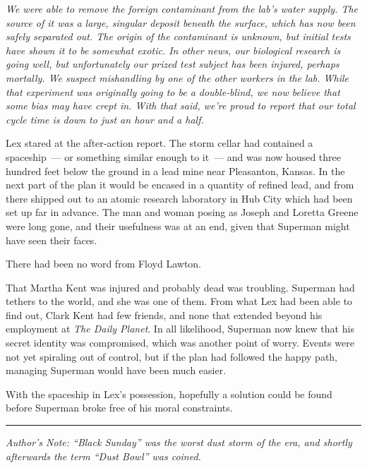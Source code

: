 \documentclass[ebook,12pt]{memoir}
\begin{document}
\emph{We were able to remove the foreign contaminant from the lab's
water supply. The source of it was a large, singular deposit beneath the
surface, which has now been safely separated out. The origin of the
contaminant is unknown, but initial tests have shown it to be somewhat
exotic. In other news, our biological research is going well, but
unfortunately our prized test subject has been injured, perhaps
mortally. We suspect mishandling by one of the other workers in the lab.
While that experiment was originally going to be a double‐blind, we now
believe that some bias may have crept in. With that said, we're proud to
report that our total cycle time is down to just an hour and a half.}

Lex stared at the after‐action report. The storm cellar had contained a
spaceship~--- or something similar enough to it~--- and was now housed
three hundred feet below the ground in a lead mine near Pleasanton,
Kansas. In the next part of the plan it would be encased in a quantity
of refined lead, and from there shipped out to an atomic research
laboratory in Hub City which had been set up far in advance. The man and
woman posing as Joseph and Loretta Greene were long gone, and their
usefulness was at an end, given that Superman might have seen their
faces.

There had been no word from Floyd Lawton.

That Martha Kent was injured and probably dead was troubling. Superman
had tethers to the world, and she was one of them. From what Lex had
been able to find out, Clark Kent had few friends, and none that
extended beyond his employment at \emph{The Daily Planet}. In all
likelihood, Superman now knew that his secret identity was compromised,
which was another point of worry. Events were not yet spiraling out of
control, but if the plan had followed the happy path, managing Superman
would have been much easier.

With the spaceship in Lex's possession, hopefully a solution could be
found before Superman broke free of his moral constraints.

\begin{center}\rule{0.5\linewidth}{0.5pt}\end{center}

\emph{Author's Note: ``Black Sunday'' was the worst dust storm of the
era, and shortly afterwards the term ``Dust Bowl'' was coined.}


\end{document}

